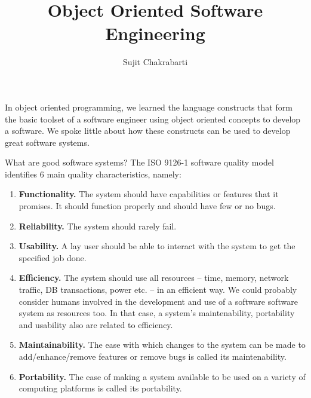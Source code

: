 \documentclass[12pt,a4paper]{article}
\author{Sujit Chakrabarti}
\title{Object Oriented Software Engineering}
\date{}
\begin{document}

\newcommand{\highlight}[1]{{\color{Red}(#1)}}
\newcommand{\comment}[1]{{\color{Blue}#1}}


\maketitle
In object oriented programming, we learned the language constructs that form the basic toolset of a software engineer using object oriented concepts to develop a software. We spoke little about how these constructs can be used to develop great software systems. 

What are good software systems? The ISO 9126-1 software quality model identifies 6 main quality characteristics, namely:
\begin{enumerate}
	\item \textbf{Functionality.} The system should have capabilities or features that it promises. It should function properly and should have few or no bugs.
	\item \textbf{Reliability.} The system should rarely fail.
	\item \textbf{Usability.} A lay user should be able to interact with the system to get the specified job done.
	\item \textbf{Efficiency.} The system should use all resources -- time, memory, network traffic, DB transactions, power etc. -- in an efficient way. We could probably consider humans involved in the development and use of a software software system as resources too. In that case, a system's maintenability, portability and usability also are related to efficiency.
	\item \textbf{Maintainability.} The ease with which changes to the system can be made to add/enhance/remove features or remove bugs is called its maintenability.
	\item \textbf{Portability.} The ease of making a system available to be used on a variety of computing platforms is called its portability.
\end{enumerate}
\end{document}
